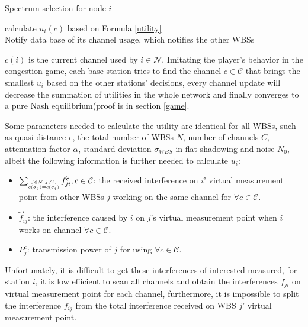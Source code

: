 \begin{algorithm}[!h]
\caption{Spectrum selection for node $i$}          %
\label{whitecatalgo} 
{
{
 calculate $u_i(c)$ based on Formula \ref{utility}\\
}
Notify data base of its channel usage, which notifies the other WBSs
}
\end{algorithm}

$c(i)$ is the current channel used by $i\in \mathcal{N}$. Imitating the player's behavior in the congestion game, each base station tries to find the channel $c\in \mathcal{C}$ that brings the smallest $u_i$ based on the other stations' decisions, every channel update will decrease the summation of utilities in the whole network and finally converges to a pure Nash equilibrium(proof is in section \ref{game}.


Some parameters needed to calculate the utility are identical for all WBSs, such as quasi distance $e$, the total number of WBSs $N$, number of channels $C$, attenuation factor $\alpha$, standard deviation $\sigma_{WBS}$ in flat shadowing and noise $N_0$, albeit the following information is further needed to calculate $u_i$: 
	\begin{itemize} %
	\item $\sum_{\tiny\substack{j\in \mathcal{N}, j\ne i,\\ c(\sigma_j)=c(\sigma_i)}}\tilde{f_{ji}^c}, c\in \mathcal{C}$: the received interference on $i$' virtual measurement point from other WBSs $j$ working on the same channel for $\forall c\in \mathcal{C}$.
	\item $\tilde f_{ij}^c$: the interference caused by $i$ on $j$'s virtual measurement point when $i$ works on channel $\forall c\in \mathcal{C}$.
	\item $P_j^c$: transmission power of $j$ for using $\forall c\in \mathcal{C}$.
	\end{itemize}
Unfortunately, it is difficult to get these interferences of interested measured, for station $i$, it is low efficient to scan all channels and obtain the interferences $f_{ji}$ on virtual measurement point for each channel, furthermore, it is impossible to split the interference $f_{ij}$ from the total interference received on WBS $j$' virtual measurement point. 

